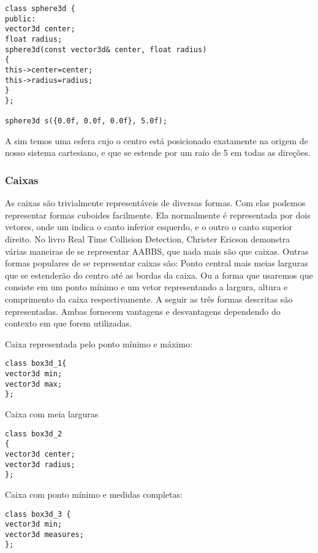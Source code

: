 \begin{lstlisting}[caption={Exemplo de esfera},label={lst:sphere1}]
class sphere3d {
public:
vector3d center;
float radius;
sphere3d(const vector3d& center, float radius)
{
this->center=center;
this->radius=radius;
}
};

sphere3d s({0.0f, 0.0f, 0.0f}, 5.0f);
\end{lstlisting}

A sim temos uma esfera cujo o centro está posicionado exatamente na origem de
nosso sistema cartesiano, e que se estende por um raio de 5 em todas as
direções.

\subsubsection{Caixas}

As caixas são trivialmente representáveis de diversas formas. Com elas podemos
representar formas cuboides facilmente. Ela normalmente é representada por dois
vetores, onde um indica o canto inferior esquerdo, e o outro o canto superior
direito. No livro Real Time Collision Detection, Christer Ericson demonstra
várias maneiras de se representar AABBS, que nada mais são que caixas.
Outras formas populares de se representar caixas são:
Ponto central mais meias larguras que se estenderão do centro até as bordas da caixa.
Ou a forma que usaremos que consiste em um ponto mínimo e um vetor
representando a largura, altura e comprimento da caixa respectivamente.
A seguir as três formas descritas são representadas. Ambas fornecem vantagens e
desvantagens dependendo do contexto em que forem utilizadas.

Caixa representada pelo ponto mínimo e máximo:

\begin{lstlisting}[caption={Exemplo de caixa1},label={lst:box1}]
class box3d_1{
vector3d min;
vector3d max;
};
\end{lstlisting}

Caixa com meia larguras

\begin{lstlisting}[caption={Exemplo de caixa2},label={lst:box2}]
class box3d_2
{
vector3d center;
vector3d radius;
};
\end{lstlisting}

Caixa com ponto mínimo e medidas completas:

\begin{lstlisting}[caption={Exemplo de caixa3},label={lst:box3}]
class box3d_3 {
vector3d min;
vector3d measures;
};
\end{lstlisting}

